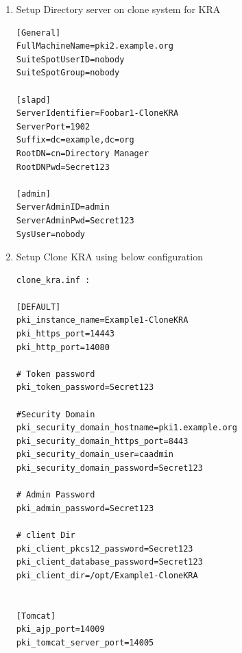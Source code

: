 \documentclass[a4paper]{article}
\begin{document}
\begin{enumerate}[label*=\arabic*.]
\begin{enumerate}[label*=\arabic*.]
\begin{enumerate}[label*=\arabic*.]
                        \item Setup Directory server on clone system for KRA
                            \begin{lstlisting}
[General]
FullMachineName=pki2.example.org
SuiteSpotUserID=nobody
SuiteSpotGroup=nobody

[slapd]
ServerIdentifier=Foobar1-CloneKRA
ServerPort=1902
Suffix=dc=example,dc=org
RootDN=cn=Directory Manager
RootDNPwd=Secret123

[admin]
ServerAdminID=admin
ServerAdminPwd=Secret123
SysUser=nobody
                            \end{lstlisting}
                        \item Setup Clone KRA using below configuration
                            \begin{lstlisting}
clone_kra.inf :

[DEFAULT]
pki_instance_name=Example1-CloneKRA
pki_https_port=14443
pki_http_port=14080

# Token password
pki_token_password=Secret123

#Security Domain
pki_security_domain_hostname=pki1.example.org
pki_security_domain_https_port=8443
pki_security_domain_user=caadmin
pki_security_domain_password=Secret123

# Admin Password
pki_admin_password=Secret123

# client Dir
pki_client_pkcs12_password=Secret123
pki_client_database_password=Secret123
pki_client_dir=/opt/Example1-CloneKRA


[Tomcat]
pki_ajp_port=14009
pki_tomcat_server_port=14005


\end{lstlisting}
\end{enumerate}
\end{enumerate}
\end{enumerate}
\end{document}
